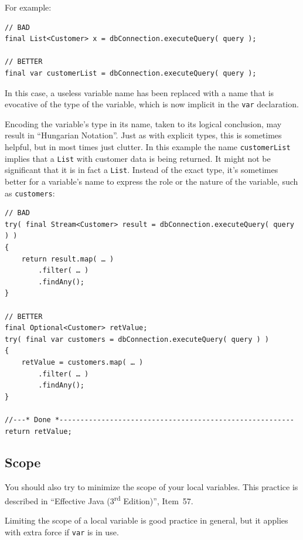 For example:
\begin{lstlisting}
// BAD
final List<Customer> x = dbConnection.executeQuery( query );

// BETTER
final var customerList = dbConnection.executeQuery( query );
\end{lstlisting}

In this case, a useless variable name has been replaced with a name that is evocative of the type of the variable, which is now implicit in the \lstinline|var| declaration.

Encoding the variable's type in its name, taken to its logical conclusion, may result in “Hungarian Notation”\autocite{WIKIPEDIA:Hungarian_notation,Jack:HungarianNotation}. Just as with explicit types, this is sometimes helpful, but in most times just clutter. In this example the name \lstinline|customerList| implies that a \lstinline|List| with customer data is being returned. It might not be significant that it is in fact a \lstinline|List|. Instead of the exact type, it’s sometimes better for a variable’s name to express the role or the nature of the variable, such as \lstinline|customers|:

\begin{lstlisting}
// BAD
try( final Stream<Customer> result = dbConnection.executeQuery( query ) ) 
{
    return result.map( … )
        .filter( … )
        .findAny();
}

// BETTER
final Optional<Customer> retValue;
try( final var customers = dbConnection.executeQuery( query ) ) 
{
    retValue = customers.map( … )
        .filter( … )
        .findAny();
}

//---* Done *--------------------------------------------------------
return retValue;
\end{lstlisting}


\subsection{Scope}\label{sec:varScope}
You should also try to minimize the scope of your local variables. This practice is described in “Effective Java (3\textsuperscript{rd} Edition)”\autocite{Bloch:EffectiveJava}, Item~57.

Limiting the scope of a local variable is good practice in general, but it applies with extra force if \lstinline|var| is in use.


